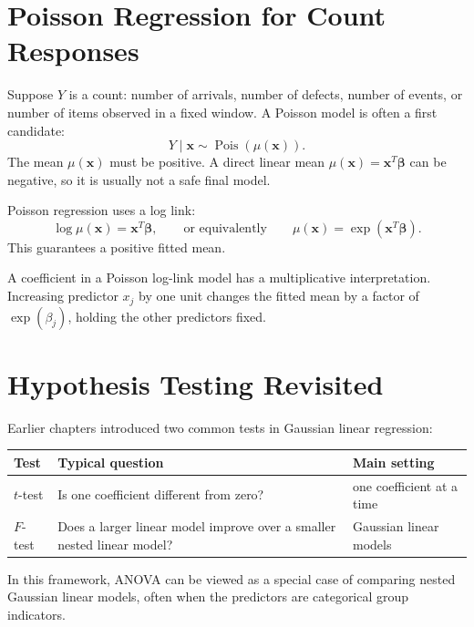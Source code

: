 \section{Poisson Regression for Count Responses}

Suppose \(Y\) is a count: number of arrivals, number of defects, number of events, or number of items observed in a fixed window.  A Poisson model is often a first candidate:
\begin{equation}
  Y\mid\mathbf{x}\sim \operatorname{Pois}(\mu(\mathbf{x})).
\end{equation}
The mean \(\mu(\mathbf{x})\) must be positive.  A direct linear mean \(\mu(\mathbf{x})=\mathbf{x}^T\boldsymbol{\beta}\) can be negative, so it is usually not a safe final model.

Poisson regression uses a log link:
\begin{equation}
  \log \mu(\mathbf{x})=\mathbf{x}^T\boldsymbol{\beta},
  \qquad\text{or equivalently}\qquad
  \mu(\mathbf{x})=\exp(\mathbf{x}^T\boldsymbol{\beta}).
  \label{eq:ch14-poisson-log-link}
\end{equation}
This guarantees a positive fitted mean.

A coefficient in a Poisson log-link model has a multiplicative interpretation.  Increasing predictor \(x_j\) by one unit changes the fitted mean by a factor of \(\exp(\beta_j)\), holding the other predictors fixed.

\section{Hypothesis Testing Revisited}

Earlier chapters introduced two common tests in Gaussian linear regression:
\begin{center}
\begin{tabular}{p{}p{}p{}}
\toprule
\textbf{Test} & \textbf{Typical question} & \textbf{Main setting} \\
\midrule
\(t\)-test & Is one coefficient different from zero? & one coefficient at a time \\
\(F\)-test & Does a larger linear model improve over a smaller nested linear model? & Gaussian linear models \\
\bottomrule
\end{tabular}
\end{center}

In this framework, ANOVA can be viewed as a special case of comparing nested Gaussian linear models, often when the predictors are categorical group indicators.


